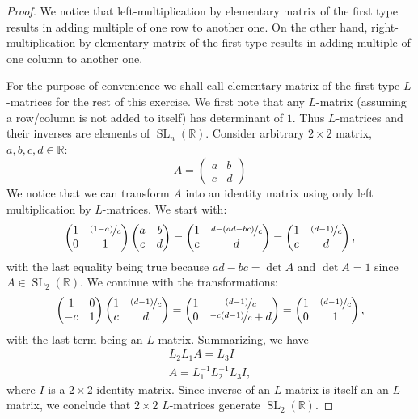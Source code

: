 \documentclass{article}
\newcommand{\R}{\mathbb{R}}
\newcommand{\SL}{\operatorname{SL}}
\newcommand{\SLnR}{\SL_n(\R)}
\begin{document}
\begin{proof}

We notice that left-multiplication by elementary matrix of the first type results in adding multiple of one row to another one. On the other hand, right-multiplication by elementary matrix of the first type results in adding multiple of one column to another one.

For the purpose of convenience we shall call elementary matrix of the first type $L$-matrices for the rest of this exercise.
We first note that any $L$-matrix (assuming a row/column is not added to itself) has determinant of $1$.
Thus $L$-matrices and their inverses are elements of $\SLnR$.
Consider arbitrary $2 \times 2$ matrix, $a,b,c,d \in \mathbb{R}$:
\[ A =
\begin{pmatrix}
	a & b \\
	c & d
\end{pmatrix}
\]
We notice that we can transform $A$ into an identity matrix using only left multiplication by $L$-matrices. We start with:
\[
\begin{pmatrix}
	1 & \nicefrac{(1-a)}{c} \\
	0 & 1
\end{pmatrix}
\begin{pmatrix}
	a & b \\
	c & d
\end{pmatrix}
=
\begin{pmatrix}
	1 & \nicefrac{d-(ad-bc)}{c} \\
	c & d
\end{pmatrix}
=
\begin{pmatrix}
	1 & \nicefrac{(d-1)}{c} \\
	c & d
\end{pmatrix},
\]
with the last equality being true because $ad-bc = \det A$ and $\det A = 1$ since $A \in \SL_2(\R)$.
We continue with the transformations:
\[
\begin{pmatrix}
	1 & 0 \\
	-c & 1
\end{pmatrix}
\begin{pmatrix}
	1 & \nicefrac{(d-1)}{c} \\
	c & d
\end{pmatrix}
=
\begin{pmatrix}
	1 & \nicefrac{(d-1)}{c} \\
	0 & \nicefrac{-c(d-1)}{c} + d
\end{pmatrix}
=
\begin{pmatrix}
	1 & \nicefrac{(d-1)}{c} \\
	0 & 1
\end{pmatrix},
\]
with the last term being an $L$-matrix.
Summarizing, we have
\begin{gather*}
    L_2 L_1 A = L_3 I \\
    A = L_1^{-1} L_2^{-1} L_3 I,
\end{gather*}
where $I$ is a $2 \times 2$ identity matrix.
Since inverse of an $L$-matrix is itself an an $L$-matrix, we conclude that $2 \times 2$ $L$-matrices generate $\SL_2(\R)$.


\end{proof}
\end{document}

